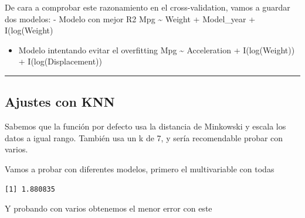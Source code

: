 \documentclass[
]{article}
\newenvironment{Shaded}{\begin{snugshade}}{\end{snugshade}}
\newcommand{\CommentTok}[1]{\textcolor[rgb]{0.56,0.35,0.01}{\textit{#1}}}
\newcommand{\DecValTok}[1]{\textcolor[rgb]{0.00,0.00,0.81}{#1}}
\newcommand{\KeywordTok}[1]{\textcolor[rgb]{0.13,0.29,0.53}{\textbf{#1}}}
\newcommand{\NormalTok}[1]{#1}
\newcommand{\OperatorTok}[1]{\textcolor[rgb]{0.81,0.36,0.00}{\textbf{#1}}}
\newcommand{\StringTok}[1]{\textcolor[rgb]{0.31,0.60,0.02}{#1}}
\providecommand{\tightlist}{%
  \setlength{\itemsep}{0pt}\setlength{\parskip}{0pt}}
\begin{document}
De cara a comprobar este razonamiento en el cross-validation, vamos a
guardar dos modelos: - Modelo con mejor R2 Mpg \textasciitilde{} Weight
+ Model\_year + I(log(Weight)

\begin{itemize}
\tightlist
\item
  Modelo intentando evitar el overfitting Mpg \textasciitilde{}
  Acceleration + I(log(Weight)) + I(log(Displacement))
\end{itemize}

\begin{center}\rule{0.5\linewidth}{0.5pt}\end{center}

\hypertarget{ajustes-con-knn}{%
\subsection{Ajustes con KNN}\label{ajustes-con-knn}}

Sabemos que la función por defecto usa la distancia de Minkowski y
escala los datos a igual rango. También usa un k de 7, y sería
recomendable probar con varios.

Vamos a probar con diferentes modelos, primero el multivariable con
todas

\begin{Shaded}
\end{Shaded}

\begin{verbatim}
[1] 1.880835
\end{verbatim}

Y probando con varios obtenemos el menor error con este

\begin{Shaded}
\end{Shaded}
\end{document}

